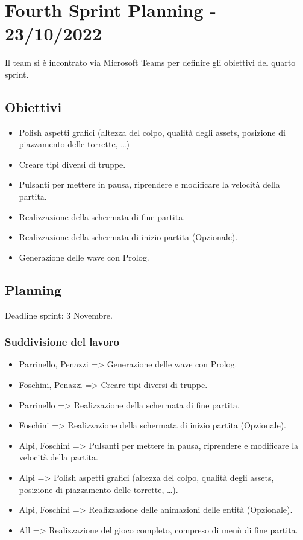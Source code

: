 \section*{Fourth Sprint Planning - 23/10/2022}
Il team si è incontrato via Microsoft Teams per definire gli obiettivi del quarto sprint.

\subsection*{Obiettivi}
\begin{itemize}
    \item Polish aspetti grafici (altezza del colpo, qualità degli assets, posizione di piazzamento delle torrette, \ldots)
    \item Creare tipi diversi di truppe.
    \item Pulsanti per mettere in pausa, riprendere e modificare la velocità della partita.
    \item Realizzazione della schermata di fine partita.
    \item Realizzazione della schermata di inizio partita (Opzionale).
    \item Generazione delle wave con Prolog.
\end{itemize}

\subsection*{Planning}
Deadline sprint: 3 Novembre.

\subsubsection*{Suddivisione del lavoro}
\begin{itemize}
    \item Parrinello, Penazzi => Generazione delle wave con Prolog.
    \item Foschini, Penazzi => Creare tipi diversi di truppe.
    \item Parrinello => Realizzazione della schermata di fine partita.
    \item Foschini => Realizzazione della schermata di inizio partita (Opzionale).
    \item Alpi, Foschini => Pulsanti per mettere in pausa, riprendere e modificare la velocità della partita.
    \item Alpi => Polish aspetti grafici (altezza del colpo, qualità degli assets, posizione di piazzamento delle torrette, \ldots).
    \item Alpi, Foschini => Realizzazione delle animazioni delle entità (Opzionale).
    \item All => Realizzazione del gioco completo, compreso di menù di fine partita.
\end{itemize}

